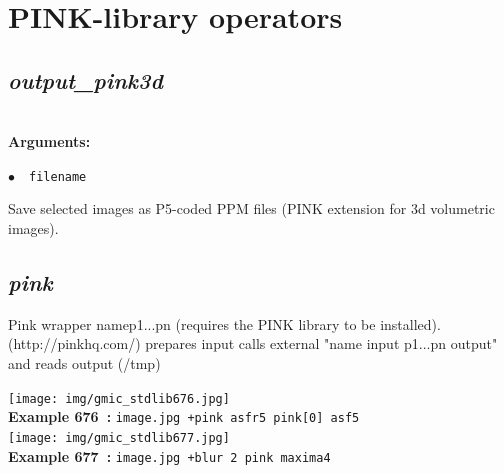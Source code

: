 \documentclass[a4paper,10.5pt,twoside]{book}
\def\comma{\discretionary{,}{}{,}}
\newcommand{\Cb}[1]{\textcolor{cb}{#1}}
\begin{document}
\section{PINK-library operators}


\subsection{\emph{output\_pink3d} }\vspace*{-0.7em}
~\\\textbf{\Cb{Arguments: }}\begin{flushleft}
{\small \Cb{\hspace*{0.5cm}$\bullet$~~\texttt{filename}}}\end{flushleft}
Save selected images as P5-coded PPM files (PINK extension for 3d volumetric images).


\subsection{\emph{pink} }\vspace*{-0.7em}
Pink wrapper name{\comma}p1{\comma}...{\comma}pn (requires the PINK library to be installed).
~\\(http://pinkhq.com/)
prepares input{\comma} calls external "name input p1...pn output" and reads output (/tmp)
\begin{center}\texttt{[image: img/gmic\_stdlib676.jpg]}\\
{\footnotesize \textbf{Example 676~:} \texttt{image.jpg +pink asfr{\comma}5 pink[0] asf{\comma}5}}
\\\texttt{[image: img/gmic\_stdlib677.jpg]}\\
{\footnotesize \textbf{Example 677~:} \texttt{image.jpg +blur 2 pink maxima{\comma}4}}
\end{center}
\end{document}
